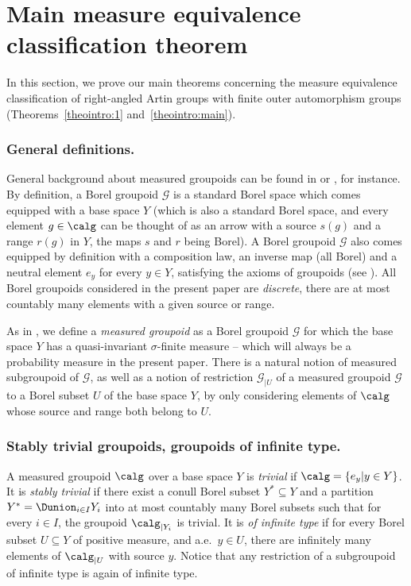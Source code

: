 \section{Main measure equivalence classification theorem}\label{sec:me}

In this section, we prove our main theorems concerning the measure equivalence classification of right-angled Artin groups with finite outer automorphism groups (Theorems~\ref{theointro:1} and~\ref{theointro:main}).


\subsubsection*{General definitions.} General background about measured groupoids can be found in \cite[\S 2.1]{AD} or \cite{Kid-survey}, for instance. By definition, a Borel groupoid $\mathcal{G}$ is a standard Borel space which comes equipped with a base space $Y$ (which is also a standard Borel space, and every element $g\in\calg$ can be thought of as an arrow with a source $s(g)$ and a range $r(g)$ in $Y$, the maps $s$ and $r$ being Borel). A Borel groupoid $\mathcal{G}$ also comes equipped by definition with a composition law, an inverse map (all Borel) and a neutral element $e_y$ for every $y\in Y$, satisfying the axioms of groupoids (see \eg \cite[Def.\,2.10]{Kid-survey}). All Borel groupoids considered in the present paper are \emph{discrete}, \ie there are at most countably many elements with a given source or range.

As in \cite[Def.\,2.13]{Kid-survey}, we define a \emph{measured groupoid} as a Borel groupoid $\mathcal{G}$ for which the base space $Y$ has a quasi-invariant $\sigma$-finite measure -- which will always be a probability measure in the present paper. There is a natural notion of measured subgroupoid of $\mathcal{G}$, as well as a notion of restriction $\mathcal{G}_{|U}$ of a measured groupoid $\mathcal{G}$ to a Borel subset $U$ of the base space $Y$, by only considering elements of $\calg$ whose source and range both belong to $U$.

\subsubsection*{Stably trivial groupoids, groupoids of infinite type.} A measured groupoid $\calg$ over a base space $Y$ is \emph{trivial} if $\calg=\{e_y|y\in Y\}$. It is \emph{stably trivial} if there exist a conull Borel subset $Y^*\subseteq Y$ and a partition $Y^*=\Dunion_{i\in I} Y_i$ into at most countably many Borel subsets such that for every $i\in I$, the groupoid $\calg_{|Y_i}$ is trivial. It is \emph{of infinite type} if for every Borel subset $U\subseteq Y$ of positive measure, and a.e.\ $y\in U$, there are infinitely many elements of $\calg_{|U}$ with source $y$. Notice that any restriction of a subgroupoid of infinite type is again of infinite type.

